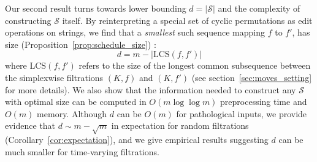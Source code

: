 \documentclass[sn-mathphys]{sn-jnl}
\begin{document}
Our second result turns towards lower bounding $d = \lvert \mathcal{S} \rvert$ and the complexity of constructing $\mathcal{S}$ itself. 
By reinterpreting a special set of cyclic permutations as edit operations on strings, we find that a  \emph{smallest} such sequence mapping $f $ to $  f'$, has size  (Proposition~\ref{prop:schedule_size}) : 
\begin{equation}
	d = m - \lvert \mathrm{LCS}(f, f') \rvert 
\end{equation}
where $\mathrm{LCS}(f,f')$ refers to the size of the longest common subsequence between the simplexwise filtrations $(K, f)$ and $(K,f')$ (see section~\ref{sec:moves_setting} for more details).
We also show that the information needed to construct any $\mathcal{S}$ with optimal size can be computed in $O(m \log \log m)$ preprocessing time and $O(m)$ memory. Although $d$  can be $O(m)$ for pathological inputs, we provide evidence  that $d \sim m - \sqrt{m}$ in expectation for random filtrations   (Corollary~\ref{cor:expectation}), and we give empirical results suggesting $d$  can be much smaller for time-varying filtrations. 
% 
\end{document}
